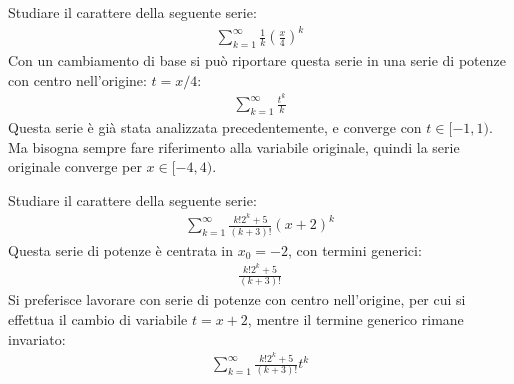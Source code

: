\documentclass{article}
\numberwithin{equation}{subsection}
\begin{document}
Studiare il carattere della seguente serie:
\begin{gather*}
    \displaystyle\sum_{k=1}^\infty\frac{1}{k}\left(\frac{x}{4}\right)^k
\end{gather*}
Con un cambiamento di base si può riportare questa serie in una serie di potenze con centro nell'origine: $t=x/4$:
\begin{gather*}
    \displaystyle\sum_{k=1}^\infty\frac{t^k}{k}
\end{gather*}
Questa serie è già stata analizzata precedentemente, e converge con $t\in[-1,1)$. Ma bisogna sempre fare riferimento alla variabile originale, quindi la serie originale converge per $x\in[-4, 4)$. 


Studiare il carattere della seguente serie:
\begin{gather*}
    \displaystyle\sum_{k=1}^\infty\frac{k!2^k+5}{(k+3)!}(x+2)^k
\end{gather*}
Questa serie di potenze è centrata in $x_0=-2$, con termini generici:
\begin{gather*}
    \displaystyle\frac{k!2^k+5}{(k+3)!}
\end{gather*}
Si preferisce lavorare con serie di potenze con centro nell'origine, per cui si effettua il cambio di variabile $t=x+2$, mentre il termine generico rimane invariato:
\begin{gather*}
    \displaystyle\sum_{k=1}^\infty\frac{k!2^k+5}{(k+3)!}t^k
\end{gather*}
\end{document}
